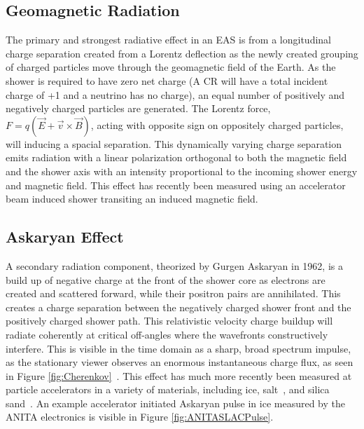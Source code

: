 	
	\subsection{Geomagnetic Radiation}
		The primary and strongest radiative effect in an EAS is from a longitudinal charge separation created from a Lorentz deflection as the newly created grouping of charged particles move through the geomagnetic field of the Earth.  As the shower is required to have zero net charge (A CR will have a total incident charge of +1 and a neutrino has no charge), an equal number of positively and negatively charged particles are generated.  The Lorentz force, $F=q(\vec{E}+\vec{v}\times\vec{B})$, acting with opposite sign on oppositely charged particles, will inducing a spacial separation.  This dynamically varying charge separation emits radiation with a linear polarization orthogonal to both the magnetic field and the shower axis with an intensity proportional to the incoming shower energy and magnetic field.  This effect has recently been measured using an accelerator beam induced shower transiting an induced magnetic field.\cite{SLACT510}
	
	\subsection{Askaryan Effect}
		A secondary radiation component, theorized by Gurgen Askaryan in 1962, is a build up of negative charge at the front of the shower core as electrons are created and scattered forward, while their positron pairs are annihilated.\cite{Askaryan:1962hbi}  This creates a charge separation between the negatively charged shower front and the positively charged shower path.  This relativistic velocity charge buildup will radiate coherently at critical off-angles where the wavefronts constructively interfere.  This is visible in the time domain as a sharp, broad spectrum impulse,  as the stationary viewer observes an enormous instantaneous charge flux, as seen in Figure \ref{fig:Cherenkov}~\cite{PhysRevD.84.103003}.  This effect has much more recently been measured at particle accelerators in a variety of materials, including ice,\cite{PhysRevLett.99.171101} salt~\cite{PhysRevD.72.023002}, and silica sand~\cite{PhysRevLett.86.2802}.  An example accelerator initiated Askaryan pulse in ice measured by the ANITA electronics is visible in Figure \ref{fig:ANITASLACPulse}.
		
